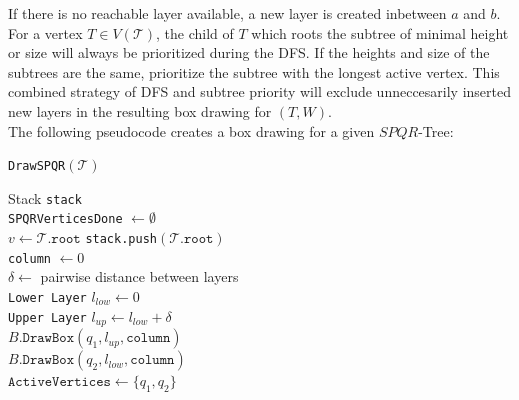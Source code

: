 If there is no reachable layer available, a new layer is created inbetween $a$ and $b$.\\
For a vertex $T\in V(\mathcal{T})$, the child of $T$ which roots the subtree of minimal height or size will always be prioritized during the DFS. If the heights and size of the subtrees are the same, prioritize the subtree with the longest active vertex. This combined strategy of DFS and subtree priority will exclude unneccesarily inserted new layers in the resulting box drawing for $(T,W)$. \\
The following pseudocode creates a box drawing for a given $SPQR$-Tree:\\
\begin{algorithm}[H]
	\caption{\texttt{DrawSPQR}$(\mathcal{T})$}\label{al:maximal_outerplanar_box_two_bends}
	\label{al:draw_SPQR}
	Stack \texttt{stack}\\
	\texttt{SPQRVerticesDone} $\gets \emptyset$\\
	$v \gets \mathcal{T}.\texttt{root}$
	\texttt{stack.push}$(\mathcal{T}.\texttt{root})$\\
	\texttt{column} $\gets 0$\\
	$\delta \gets $ pairwise distance between layers\\
	\texttt{Lower Layer} $l_{low} \gets 0$\\
	\texttt{Upper Layer} $l_{up} \gets l_{low} + \delta$\\
	$B.\texttt{DrawBox}(q_1, l_{up}, \texttt{column})$\\
	$B.\texttt{DrawBox}(q_2, l_{low}, \texttt{column})$\\
	$\texttt{ActiveVertices} \gets \{q_1,q_2\}$\\
\end{algorithm}
